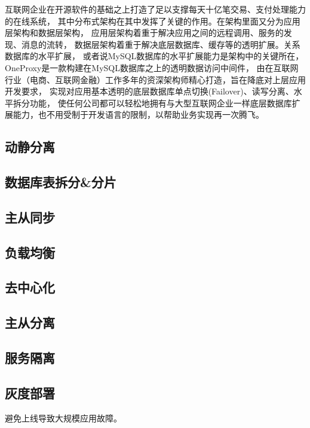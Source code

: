\documentclass{book}
\begin{document}
互联网企业在开源软件的基础之上打造了足以支撑每天十亿笔交易、支付处理能力的在线系统，
其中分布式架构在其中发挥了关键的作用。在架构里面又分为应用层架构和数据层架构，
应用层架构着重于解决应用之间的远程调用、服务的发现、消息的流转，
数据层架构着重于解决底层数据库、缓存等的透明扩展。关系数据库的水平扩展，
或者说MySQL数据库的水平扩展能力是架构中的关键所在，OneProxy是一款构建在MySQL数据库之上的透明数据访问中间件，
由在互联网行业（电商、互联网金融）工作多年的资深架构师精心打造，旨在降底对上层应用开发要求，
实现对应用基本透明的底层数据库单点切换(Failover)、读写分离、水平拆分功能，
使任何公司都可以轻松地拥有与大型互联网企业一样底层数据库扩展能力，也不用受制于开发语言的限制，以帮助业务实现再一次腾飞。

\subsection{动静分离}

\subsection{数据库表拆分\&分片}

\subsection{主从同步}

\subsection{负载均衡}

\subsection{去中心化}

\subsection{主从分离}

\subsection{服务隔离}

\subsection{灰度部署}

避免上线导致大规模应用故障。
\end{document}
